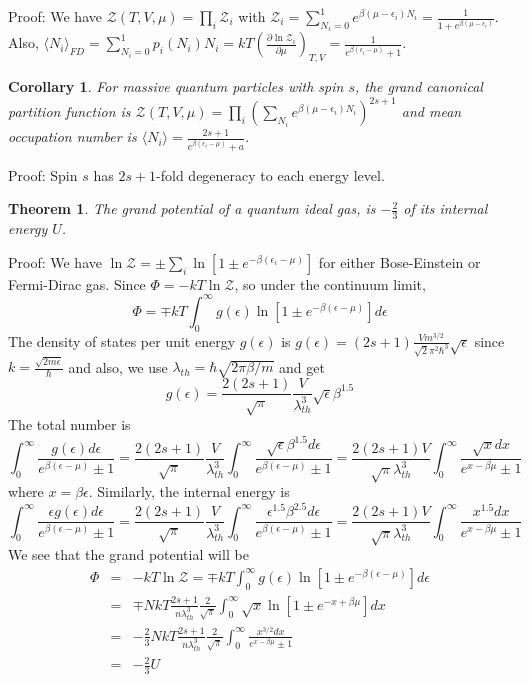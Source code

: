 \documentclass[a4paper]{article}
\newtheorem{thm}{Theorem}[section]
\newtheorem{cor}{Corollary}[section]
\theoremstyle{new}
\begin{document}
Proof: We have $\mathcal{Z}(T,V,\mu)=\prod_i\mathcal{Z}_i$ with $\mathcal{Z}_i=\sum_{N_i=0}^1e^{\beta(\mu-\epsilon_i)N_i}=\frac{1}{1+e^{\beta(\mu-\epsilon_i)}}$. Also, $\langle N_i\rangle_{FD}=\sum_{N_i=0}^1p_i(N_i)N_i=kT(\frac{\partial\ln\mathcal{Z}_i}{\partial\mu})_{T,V}=\frac{1}{e^{\beta(\epsilon_i-\mu)}+1}$.
\begin{cor}
For massive quantum particles with spin $s$, the grand canonical partition function is $\mathcal{Z}(T,V,\mu)=\prod_i(\sum_{N_i}e^{\beta(\mu-\epsilon_i)N_i})^{2s+1}$ and mean occupation number is $\langle N_i\rangle=\frac{2s+1}{e^{\beta(\epsilon_i-\mu)}+a}$.
\end{cor}
Proof: Spin $s$ has $2s+1$-fold degeneracy to each energy level.
\begin{thm}
The grand potential of a quantum ideal gas, is $-\frac{2}{3}$ of its internal energy $U$.
\end{thm}
Proof: We have $\ln\mathcal{Z}=\pm\sum_i\ln[1\pm e^{-\beta(\epsilon_i-\mu)}]$ for either Bose-Einstein or Fermi-Dirac gas. Since $\Phi=-kT\ln\mathcal{Z}$, so under the continuum limit,
$$\Phi=\mp kT\int_0^\infty g(\epsilon)\ln[1\pm e^{-\beta(\epsilon-\mu)}]d\epsilon$$
The density of states per unit energy $g(\epsilon)$ is $g(\epsilon)=(2s+1)\frac{Vm^{3/2}}{\sqrt{2}\pi^2\hbar^3}\sqrt{\epsilon}$ since $k=\frac{\sqrt{2m\epsilon}}{\hbar}$ and also, we use $\lambda_{th}=\hbar\sqrt{2\pi\beta/m}$ and get
$$g(\epsilon)=\frac{2(2s+1)}{\sqrt{\pi}}\frac{V}{\lambda_{th}^3}\sqrt{\epsilon}\beta^{1.5}$$
The total number is $$\int_0^\infty\frac{g(\epsilon)d\epsilon}{e^{\beta(\epsilon-\mu)}\pm1}=\frac{2(2s+1)}{\sqrt{\pi}}\frac{V}{\lambda_{th}^3}\int_0^\infty\frac{\sqrt{\epsilon}\beta^{1.5}d\epsilon}{e^{\beta(\epsilon-\mu)}\pm1}=\frac{2(2s+1)V}{\sqrt{\pi}\lambda_{th}^3}\int_0^\infty\frac{\sqrt{x}dx}{e^{x-\beta\mu}\pm1}$$
where $x=\beta\epsilon$. Similarly, the internal energy is
$$\int_0^\infty\frac{\epsilon g(\epsilon)d\epsilon}{e^{\beta(\epsilon-\mu)}\pm1}=\frac{2(2s+1)}{\sqrt{\pi}}\frac{V}{\lambda_{th}^3}\int_0^\infty\frac{\epsilon^{1.5}\beta^{2.5}d\epsilon}{e^{\beta(\epsilon-\mu)}\pm1}=\frac{2(2s+1)V}{\sqrt{\pi}\lambda_{th}^3}\int_0^\infty\frac{x^{1.5}dx}{e^{x-\beta\mu}\pm1}$$
We see that the grand potential will be
\begin{eqnarray}
\Phi&=&-kT\ln\mathcal{Z}=\mp kT\int_0^\infty g(\epsilon)\ln[1\pm e^{-\beta(\epsilon-\mu)}]d\epsilon\nonumber\\&=&\mp NkT\frac{2s+1}{n\lambda_{th}^3}\frac{2}{\sqrt{\pi}}\int_0^\infty\sqrt{x}\ln[1\pm e^{-x+\beta\mu}]dx\nonumber\\&=&-\frac{2}{3}NkT\frac{2s+1}{n\lambda_{th}^3}\frac{2}{\sqrt{\pi}}\int_0^\infty\frac{x^{3/2}dx}{e^{x-\beta\mu}\pm1}\nonumber\\&=&-\frac{2}{3}U\nonumber
\end{eqnarray}
\end{document}

